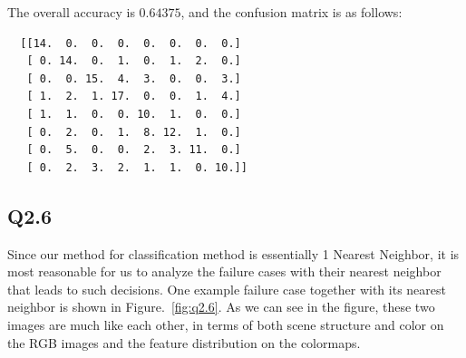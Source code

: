 \documentclass[11pt]{article}
\begin{document}
The overall accuracy is $0.64375$, and the confusion matrix is as follows:

\begin{verbatim}
  [[14.  0.  0.  0.  0.  0.  0.  0.]
   [ 0. 14.  0.  1.  0.  1.  2.  0.]
   [ 0.  0. 15.  4.  3.  0.  0.  3.]
   [ 1.  2.  1. 17.  0.  0.  1.  4.]
   [ 1.  1.  0.  0. 10.  1.  0.  0.]
   [ 0.  2.  0.  1.  8. 12.  1.  0.]
   [ 0.  5.  0.  0.  2.  3. 11.  0.]
   [ 0.  2.  3.  2.  1.  1.  0. 10.]]
\end{verbatim}

\newpage

\subsection*{Q2.6}

Since our method for classification method is essentially 1 Nearest Neighbor, it is most reasonable for us to analyze the failure cases with their nearest neighbor that leads to such decisions. One example failure case together with its nearest neighbor is shown in Figure.~\ref{fig:q2.6}. As we can see in the figure, these two images are much like each other, in terms of both scene structure and color on the RGB images and the feature distribution on the colormaps.
\end{document}
